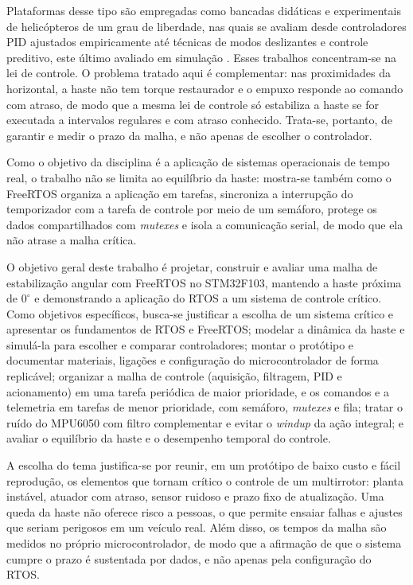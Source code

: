 Plataformas desse tipo são empregadas como bancadas didáticas e experimentais de helicópteros de um grau de liberdade, nas quais se avaliam desde controladores PID ajustados empiricamente \cite[p.~5]{mane2019} até técnicas de modos deslizantes \cite[p.~3292]{cuero2020} e controle preditivo, este último avaliado em simulação \cite{uyar2024}. Esses trabalhos concentram-se na lei de controle. O problema tratado aqui é complementar: nas proximidades da horizontal, a haste não tem torque restaurador e o empuxo responde ao comando com atraso, de modo que a mesma lei de controle só estabiliza a haste se for executada a intervalos regulares e com atraso conhecido. Trata-se, portanto, de garantir e medir o prazo da malha, e não apenas de escolher o controlador.

Como o objetivo da disciplina é a aplicação de sistemas operacionais de tempo real, o trabalho não se limita ao equilíbrio da haste: mostra-se também como o FreeRTOS organiza a aplicação em tarefas, sincroniza a interrupção do temporizador com a tarefa de controle por meio de um semáforo, protege os dados compartilhados com \textit{mutexes} e isola a comunicação serial, de modo que ela não atrase a malha crítica.

O objetivo geral deste trabalho é projetar, construir e avaliar uma malha de estabilização angular com FreeRTOS no STM32F103, mantendo a haste próxima de $0^\circ$ e demonstrando a aplicação do RTOS a um sistema de controle crítico. Como objetivos específicos, busca-se justificar a escolha de um sistema crítico e apresentar os fundamentos de RTOS e FreeRTOS; modelar a dinâmica da haste e simulá-la para escolher e comparar controladores; montar o protótipo e documentar materiais, ligações e configuração do microcontrolador de forma replicável; organizar a malha de controle (aquisição, filtragem, PID e acionamento) em uma tarefa periódica de maior prioridade, e os comandos e a telemetria em tarefas de menor prioridade, com semáforo, \textit{mutexes} e fila; tratar o ruído do MPU6050 com filtro complementar e evitar o \textit{windup} da ação integral; e avaliar o equilíbrio da haste e o desempenho temporal do controle.

A escolha do tema justifica-se por reunir, em um protótipo de baixo custo e fácil reprodução, os elementos que tornam crítico o controle de um multirrotor: planta instável, atuador com atraso, sensor ruidoso e prazo fixo de atualização. Uma queda da haste não oferece risco a pessoas, o que permite ensaiar falhas e ajustes que seriam perigosos em um veículo real. Além disso, os tempos da malha são medidos no próprio microcontrolador, de modo que a afirmação de que o sistema cumpre o prazo é sustentada por dados, e não apenas pela configuração do RTOS.

